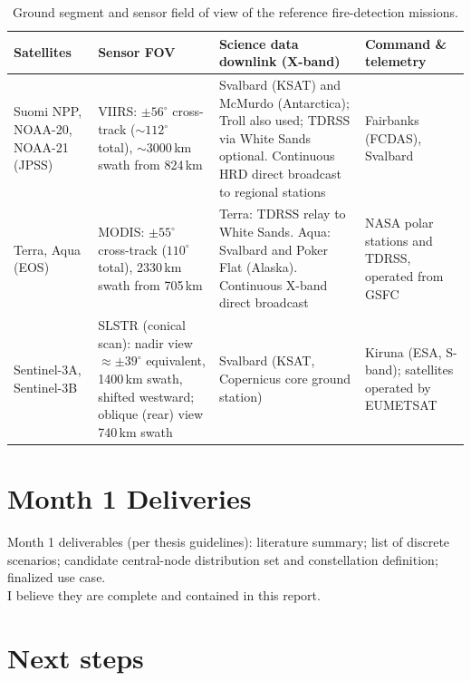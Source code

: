 \documentclass[11pt]{article}
\begin{document}
\begin{table}[h]
\centering
\begin{tabular}{p{2.6cm} p{3.6cm} p{4.6cm} p{3.2cm}}
\hline
\textbf{Satellites} & \textbf{Sensor FOV} & \textbf{Science data downlink (X-band)} & \textbf{Command \& telemetry} \\
\hline
Suomi NPP, NOAA-20, NOAA-21 (JPSS) & VIIRS: $\pm 56^\circ$ cross-track ($\sim 112^\circ$ total), $\sim$3000\,km swath from 824\,km & Svalbard (KSAT) and McMurdo (Antarctica); Troll also used; TDRSS via White Sands optional. Continuous HRD direct broadcast to regional stations & Fairbanks (FCDAS), Svalbard \\
Terra, Aqua (EOS) & MODIS: $\pm 55^\circ$ cross-track ($110^\circ$ total), 2330\,km swath from 705\,km & Terra: TDRSS relay to White Sands. Aqua: Svalbard and Poker Flat (Alaska). Continuous X-band direct broadcast & NASA polar stations and TDRSS, operated from GSFC \\
Sentinel-3A, Sentinel-3B & SLSTR (conical scan): nadir view $\approx \pm 39^\circ$ equivalent, 1400\,km swath, shifted westward; oblique (rear) view 740\,km swath & Svalbard (KSAT, Copernicus core ground station) & Kiruna (ESA, S-band); satellites operated by EUMETSAT \\
\hline
\end{tabular}
\caption{Ground segment and sensor field of view of the reference fire-detection missions.}
\label{tab:fire_sats_gs}
\end{table}

\section{Month 1 Deliveries}

Month 1 deliverables (per thesis guidelines): literature summary; list of discrete scenarios; candidate central-node distribution set and constellation definition; finalized use case.\\
I believe they are complete and contained in this report.

\section{Next steps}
\end{document}
